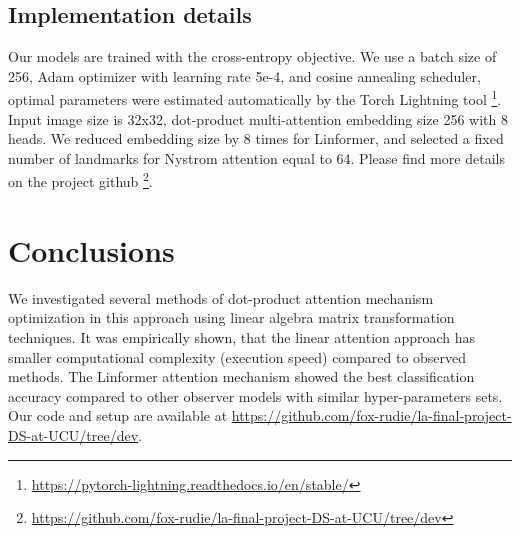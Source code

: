 \subsection{Implementation details}
Our models are trained with the cross-entropy objective. We use a batch size of 256, Adam optimizer with learning rate 5e-4, and cosine annealing scheduler, optimal parameters were estimated automatically by the Torch Lightning tool \footnote{\url{https://pytorch-lightning.readthedocs.io/en/stable/}}. Input image size is 32x32, dot-product multi-attention embedding size 256 with 8 heads. We reduced embedding size by 8 times for Linformer, and selected a fixed number of landmarks for Nystrom attention equal to 64.
 Please find more details on the project github \footnote{\url{https://github.com/fox-rudie/la-final-project-DS-at-UCU/tree/dev}}.



\section{Conclusions}

We investigated several methods of dot-product attention mechanism optimization in this approach using linear algebra matrix transformation techniques. It was empirically shown, that the linear attention approach has smaller computational complexity (execution speed) compared to observed methods. The Linformer attention mechanism showed the best classification accuracy compared to other observer models with similar hyper-parameters sets. Our code and setup are available at  \url{https://github.com/fox-rudie/la-final-project-DS-at-UCU/tree/dev}.


